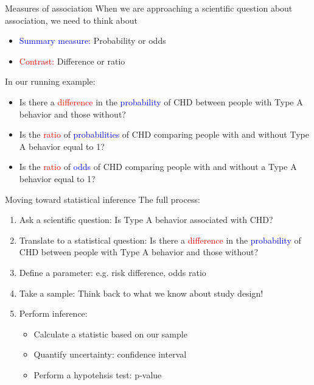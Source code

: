 \documentclass{beamer}
\begin{document}
\begin{frame}{Measures of association}
When we are approaching a scientific question about association, we need to think about
\begin{itemize}
	\item \textcolor{blue}{Summary measure:} Probability or odds
	\item \textcolor{red}{Contrast:} Difference or ratio
\end{itemize}
\vspace{0.5cm}
In our running example:
\begin{itemize}
	\item Is there a \textcolor{red}{difference} in the \textcolor{blue}{probability} of CHD between people with Type A behavior and those without?
	\item Is the \textcolor{red}{ratio} of \textcolor{blue}{probabilities} of CHD comparing people with and without Type A behavior equal to 1?
	\item Is the \textcolor{red}{ratio} of \textcolor{blue}{odds} of CHD comparing people with and without a Type A behavior equal to 1?
\end{itemize}
\end{frame}

\begin{frame}{Moving toward statistical inference}
	The full process:
	\begin{enumerate}
		\item Ask a scientific question: Is Type A behavior associated with CHD?
		\item Translate to a statistical question: Is there a \textcolor{red}{difference} in the \textcolor{blue}{probability} of CHD between people with Type A behavior and those without?
		\item Define a parameter: e.g. risk difference, odds ratio
		\item Take a sample: Think back to what we know about study design!
		\item Perform inference: 
		\begin{itemize}
			\item Calculate a statistic based on our sample
			\item Quantify uncertainty: confidence interval
			\item Perform a hypotehsis test: p-value
		\end{itemize}
	\end{enumerate}
\end{frame}
\end{document}
